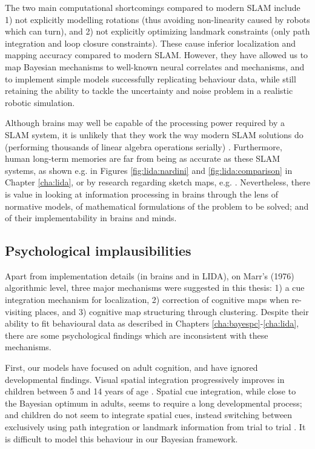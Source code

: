 The two main computational shortcomings compared to modern SLAM include 1) not explicitly modelling rotations (thus avoiding non-linearity caused by robots which can turn), and 2) not explicitly optimizing landmark constraints (only path integration and loop closure constraints). These cause inferior localization and mapping accuracy compared to modern SLAM. However, they have allowed us to map Bayesian mechanisms to well-known neural correlates and mechanisms, and to implement simple models successfully replicating behaviour data, while still retaining the ability to tackle the uncertainty and noise problem in a realistic robotic simulation.

Although brains may well be capable of the processing power required by a SLAM system, it is unlikely that they work the way modern SLAM solutions do (performing thousands of linear algebra operations serially) \citep{thrun2008simultaneous}. Furthermore, human long-term memories are far from being as accurate as these SLAM systems, as shown e.g. in Figures \ref{fig:lida:nardini} and \ref{fig:lida:comparison} in Chapter \ref{cha:lida}, or by research regarding sketch maps, e.g. \citep{rovine1989sketch, wang2009accuracy}. Nevertheless, there is value in looking at information processing in brains through the lens of normative models, of mathematical formulations of the problem to be solved; and of their implementability in brains and minds. 

\subsection{Psychological implausibilities}

Apart from implementation details (in brains and in LIDA), on Marr's (1976) algorithmic level, three major mechanisms were suggested in this thesis: 1) a cue integration mechanism for localization, 2) correction of cognitive maps when re-visiting places, and 3) cognitive map structuring through clustering. Despite their ability to fit behavioural data as described in Chapters \ref{cha:bayespc}-\ref{cha:lida}, there are some psychological findings which are inconsistent with these mechanisms. 

First, our models have focused on adult cognition, and have ignored developmental findings. Visual spatial integration progressively improves in children between 5 and 14 years of age \citep{kovacs1999late}. Spatial cue integration, while close to the Bayesian optimum in adults, seems to require a long developmental process; and children do not seem to integrate spatial cues, instead switching between exclusively using path integration or landmark information from trial to trial \citep{nardini2008development}. It is difficult to model this behaviour in our Bayesian framework.


